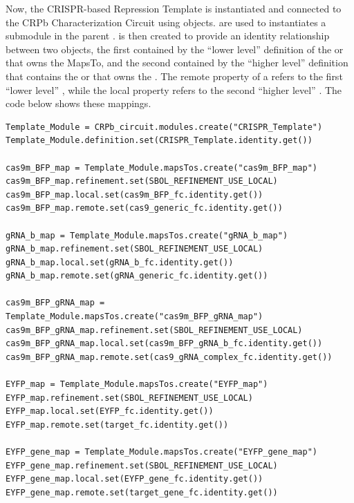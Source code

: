Now, the CRISPR-based Repression Template  is instantiated and connected to the CRPb Characterization Circuit using  objects.  are used to instantiates a submodule in the parent .  is then created to provide an identity relationship between two  objects, the first contained by the “lower level” definition of the  or  that owns the MapsTo, and the second contained by the “higher level” definition that contains the  or  that owns the . The remote property of a  refers to the first “lower level” , while the local property refers to the second “higher level” . The code below shows these mappings. 

\vspace{\abovedisplayskip}
\begin{minipage}{0.95\textwidth}
\begin{lstlisting}
Template_Module = CRPb_circuit.modules.create("CRISPR_Template")
Template_Module.definition.set(CRISPR_Template.identity.get())

cas9m_BFP_map = Template_Module.mapsTos.create("cas9m_BFP_map")
cas9m_BFP_map.refinement.set(SBOL_REFINEMENT_USE_LOCAL)
cas9m_BFP_map.local.set(cas9m_BFP_fc.identity.get())
cas9m_BFP_map.remote.set(cas9_generic_fc.identity.get())

gRNA_b_map = Template_Module.mapsTos.create("gRNA_b_map")
gRNA_b_map.refinement.set(SBOL_REFINEMENT_USE_LOCAL)
gRNA_b_map.local.set(gRNA_b_fc.identity.get())
gRNA_b_map.remote.set(gRNA_generic_fc.identity.get())

cas9m_BFP_gRNA_map = Template_Module.mapsTos.create("cas9m_BFP_gRNA_map")
cas9m_BFP_gRNA_map.refinement.set(SBOL_REFINEMENT_USE_LOCAL)
cas9m_BFP_gRNA_map.local.set(cas9m_BFP_gRNA_b_fc.identity.get())
cas9m_BFP_gRNA_map.remote.set(cas9_gRNA_complex_fc.identity.get())

EYFP_map = Template_Module.mapsTos.create("EYFP_map")
EYFP_map.refinement.set(SBOL_REFINEMENT_USE_LOCAL)
EYFP_map.local.set(EYFP_fc.identity.get())
EYFP_map.remote.set(target_fc.identity.get())

EYFP_gene_map = Template_Module.mapsTos.create("EYFP_gene_map")
EYFP_gene_map.refinement.set(SBOL_REFINEMENT_USE_LOCAL)
EYFP_gene_map.local.set(EYFP_gene_fc.identity.get())
EYFP_gene_map.remote.set(target_gene_fc.identity.get())
\end{lstlisting}
\end{minipage}

